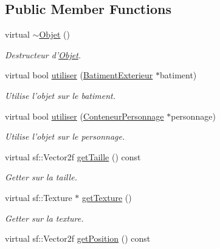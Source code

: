 \subsection*{Public Member Functions}
\begin{DoxyCompactItemize}
\item 
\hypertarget{classObjet_a8d9fa6fa05b9f5a99ab60d08f6b558ee}{virtual \hyperlink{classObjet_a8d9fa6fa05b9f5a99ab60d08f6b558ee}{$\sim$\-Objet} ()}\label{classObjet_a8d9fa6fa05b9f5a99ab60d08f6b558ee}

\begin{DoxyCompactList}\small\item\em Destructeur d'\hyperlink{classObjet}{Objet}. \end{DoxyCompactList}\item 
virtual bool \hyperlink{classObjet_aa42120788671add668e0c607aaea0f8b}{utiliser} (\hyperlink{classBatimentExterieur}{Batiment\-Exterieur} $\ast$batiment)
\begin{DoxyCompactList}\small\item\em Utilise l'objet sur le batiment. \end{DoxyCompactList}\item 
virtual bool \hyperlink{classObjet_ab77ed2841900ad8a4812c7fdfc0b0ef4}{utiliser} (\hyperlink{classConteneurPersonnage}{Conteneur\-Personnage} $\ast$personnage)
\begin{DoxyCompactList}\small\item\em Utilise l'objet sur le personnage. \end{DoxyCompactList}\item 
\hypertarget{classObjet_affa0e64f132c9e1f1664821c502e6d58}{virtual sf\-::\-Vector2f \hyperlink{classObjet_affa0e64f132c9e1f1664821c502e6d58}{get\-Taille} () const }\label{classObjet_affa0e64f132c9e1f1664821c502e6d58}

\begin{DoxyCompactList}\small\item\em Getter sur la taille. \end{DoxyCompactList}\item 
virtual sf\-::\-Texture $\ast$ \hyperlink{classObjet_a999c31b28d6a5a41af6ab335f8c440bc}{get\-Texture} ()
\begin{DoxyCompactList}\small\item\em Getter sur la texture. \end{DoxyCompactList}\item 
\hypertarget{classObjet_a0bd7ce5c2239351c1e9bb6e1006ec593}{virtual sf\-::\-Vector2f \hyperlink{classObjet_a0bd7ce5c2239351c1e9bb6e1006ec593}{get\-Position} () const }\label{classObjet_a0bd7ce5c2239351c1e9bb6e1006ec593}


\end{DoxyCompactItemize}
